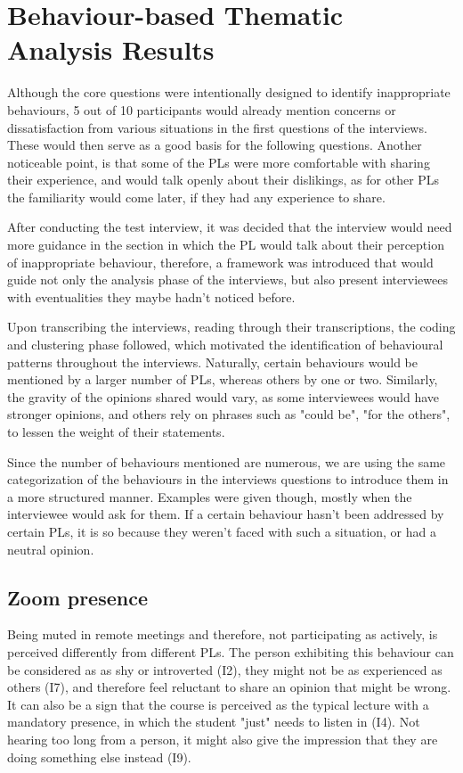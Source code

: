 \section{Behaviour-based Thematic Analysis Results}\label{Behaviours}

Although the core questions were intentionally designed to identify inappropriate behaviours, 5 out of 10 participants would already mention concerns or dissatisfaction from various situations in the first questions of the interviews. These would then serve as a good basis for the following questions. Another noticeable point, is that some of the PLs were more comfortable with sharing their experience, and would talk openly about their dislikings, as for other PLs the familiarity would come later, if they had any experience to share. 

After conducting the test interview, it was decided that the interview would need more guidance in the section in which the PL would talk about their perception of inappropriate behaviour, therefore, a framework was introduced that would guide not only the analysis phase of the interviews, but also present interviewees with eventualities they maybe hadn't noticed before.

Upon transcribing the interviews, reading through their transcriptions, the coding and clustering phase followed, which motivated the identification of behavioural patterns throughout the interviews. Naturally, certain behaviours would be mentioned by a larger number of PLs, whereas others by one or two. Similarly, the gravity of the opinions shared would vary, as some interviewees would have stronger opinions, and others rely on phrases such as "could be", "for the others", to lessen the weight of their statements.

Since the number of behaviours mentioned are numerous, we are using the same categorization of the behaviours in the interviews questions to introduce them in a more structured manner. Examples were given though, mostly when the interviewee would ask for them. If a certain behaviour hasn't been addressed by certain PLs, it is so because they weren't faced with such a situation, or had a neutral opinion. 

\subsection{Zoom presence}

Being muted in remote meetings and therefore, not participating as actively, is perceived differently from different PLs. The person exhibiting this behaviour can be considered as as shy or introverted (I2), they might not be as experienced as others (I7), and therefore feel reluctant to share an opinion that might be wrong. It can also be a sign that the course is perceived as the typical lecture with a mandatory presence, in which the student "just" needs to listen in (I4). Not hearing too long from a person, it might also give the impression that they are doing something else instead (I9).

